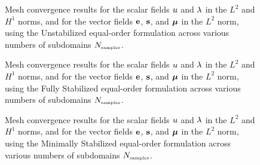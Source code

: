 \begin{figure}[h!]
	\centering
	\caption{Mesh convergence results for the scalar fields $u$ and $\lambda$ in the $L^2$ and $H^1$ norms, and for the vector fields $\mathbf{e}$, $\mathbf{s}$, and $\boldsymbol{\mu}$ in the $L^2$ norm, using the  Unstabilized equal-order formulation across various numbers of subdomains $N_{\mbox{\tiny samples}}$.}
	\def\svgwidth{1.0\columnwidth}
	
	\label{fig:quadricula_convergence_equal_order_unstabilized_linear}
\end{figure}

\begin{figure}[h!]
	\centering
	\caption{Mesh convergence results for the scalar fields $u$ and $\lambda$ in the $L^2$ and $H^1$ norms, and for the vector fields $\mathbf{e}$, $\mathbf{s}$, and $\boldsymbol{\mu}$ in the $L^2$ norm, using the Fully Stabilized equal-order formulation across various numbers of subdomains $N_{\mbox{\tiny samples}}$.}
	\def\svgwidth{1.0\columnwidth}
	
	\label{fig:quadricula_convergence_equal_order_fully_stabilized_linear}
\end{figure}


\begin{figure}[h!]
	\centering
	\caption{Mesh convergence results for the scalar fields $u$ and $\lambda$ in the $L^2$ and $H^1$ norms, and for the vector fields $\mathbf{e}$, $\mathbf{s}$, and $\boldsymbol{\mu}$ in the $L^2$ norm, using the Minimally Stabilized equal-order formulation across various numbers of subdomains $N_{\mbox{\tiny samples}}$.}
	\def\svgwidth{1.0\columnwidth}
	
	\label{fig:quadricula_convergence_equal_order_minimally_stabilized_linear}
\end{figure}



